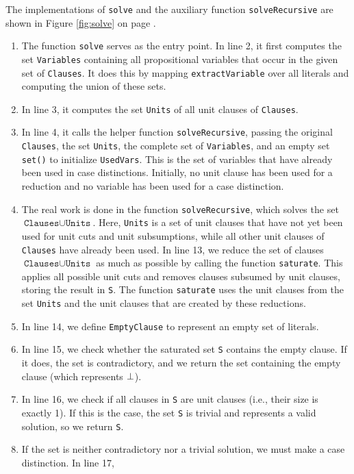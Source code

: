 The implementations of \texttt{solve} and the auxiliary function \texttt{solveRecursive} are shown in Figure
\ref{fig:solve} on page \pageref{fig:solve}.
\begin{enumerate}
\item The function \texttt{solve} serves as the entry point. In line 2, it first computes the set
  \texttt{Variables} containing all propositional variables that occur in the given set of \texttt{Clauses}. It
  does this by mapping \texttt{extractVariable} over all literals and computing the union of these sets.
\item In line 3, it computes the set \texttt{Units} of all unit clauses of \texttt{Clauses}.
\item In line 4, it calls the helper function \texttt{solveRecursive}, passing the original \texttt{Clauses},
  the set \texttt{Units}, the complete set of \texttt{Variables}, and an empty set \texttt{set()} to initialize
  \texttt{UsedVars}.  This is the set of variables that have already been used in case distinctions.
  Initially, no unit clause has been used for a reduction and no variable has been used for a case
  distinction.
\item The real work is done in the function \texttt{solveRecursive}, which solves the set
  $\texttt{Clauses} \cup \texttt{Units}$.  Here, \texttt{Units} is a set of unit clauses that have not yet
  been used for unit cuts and unit subsumptions, while all other unit clauses of \texttt{Clauses} have already
  been used.  In line 13, we reduce the set of clauses $\texttt{Clauses} \cup \texttt{Units}$ as much as
  possible by calling the function \texttt{saturate}. This applies all possible unit cuts and removes clauses
  subsumed by unit clauses, storing the result in \texttt{S}.  The function \texttt{saturate} uses the unit
  clauses from the set \texttt{Units} and the unit clauses that are created by these reductions.
\item In line 14, we define \texttt{EmptyClause} to represent an empty set of literals.
\item In line 15, we check whether the saturated set \texttt{S} contains the empty clause. If it does, the set
  is contradictory, and we return the set containing the empty clause (which represents $\bot$).
\item In line 16, we check if all clauses in \texttt{S} are unit clauses (i.e., their size is exactly 1). If
  this is the case, the set \texttt{S} is trivial and represents a valid solution, so we return \texttt{S}.
\item If the set is neither contradictory nor a trivial solution, we must make a case distinction. In line 17,

\end{enumerate}
